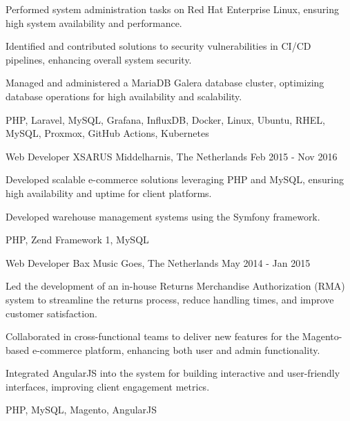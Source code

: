 \begin{cventries}
{\begin{cvitems}
        \item {Performed system administration tasks on Red Hat Enterprise Linux, ensuring high system availability and performance.}
        \item {Identified and contributed solutions to security vulnerabilities in CI/CD pipelines, enhancing overall system security.}
        \item {Managed and administered a MariaDB Galera database cluster, optimizing database operations for high availability and scalability.}
      \end{cvitems}
    }
    {PHP, Laravel, MySQL, Grafana, InfluxDB, Docker, Linux, Ubuntu, RHEL, MySQL, Proxmox, GitHub Actions, Kubernetes}

\newpage

  \cventry
    {Web Developer} %
    {XSARUS} %
    {Middelharnis, The Netherlands} %
    {Feb 2015 - Nov 2016} %
    {
      \begin{cvitems} %
        \item {Developed scalable e-commerce solutions leveraging PHP and MySQL, ensuring high availability and uptime for client platforms.}
        \item {Developed warehouse management systems using the Symfony framework.}
      \end{cvitems}
    }
    {PHP, Zend Framework 1, MySQL}

  \cventry
    {Web Developer} %
    {Bax Music} %
    {Goes, The Netherlands} %
    {May 2014 - Jan 2015} %
    {
      \begin{cvitems} %
        \item {Led the development of an in-house Returns Merchandise Authorization (RMA) system to streamline the returns process, reduce handling times, and improve customer satisfaction.}
        \item {Collaborated in cross-functional teams to deliver new features for the Magento-based e-commerce platform, enhancing both user and admin functionality.}
        \item {Integrated AngularJS into the system for building interactive and user-friendly interfaces, improving client engagement metrics.}
      \end{cvitems}
    }
    {PHP, MySQL, Magento, AngularJS}


\end{cventries}
